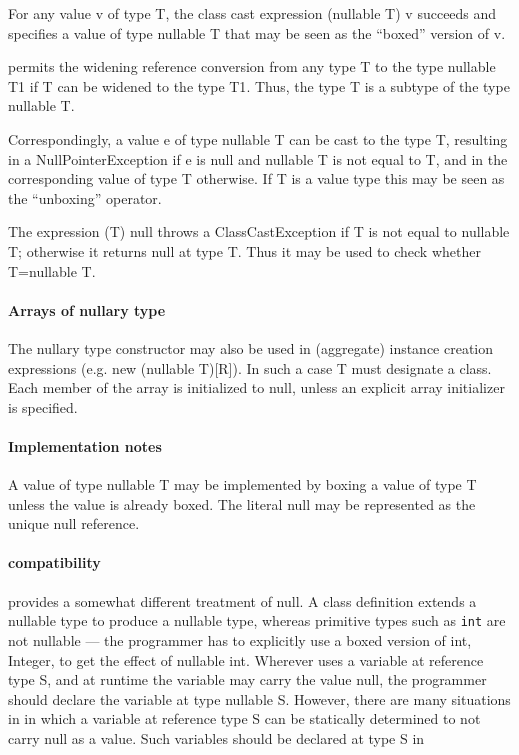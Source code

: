 For any value {\cf v} of type {\cf T}, the class cast expression {\cf
(nullable T) v} succeeds and specifies a value of type {\cf nullable T} that may be
seen as the ``boxed'' version of {\cf v}.

\Xten{} permits the widening reference conversion from any type {\cf T}
to the type {\cf nullable T1} if {\cf T} can be widened to the type {\cf
T1}. Thus, the type {\cf T} is a subtype of the type {\cf nullable T}.

Correspondingly, a value {\cf e} of type {\cf nullable T} can be cast to the
type {\cf T}, resulting in a {\cf NullPointerException} if {\cf e} is
{\cf null} and {\cf nullable T} is not equal to {\cf T}, and in the
corresponding value of type {\cf T} otherwise.  If {\cf T} is a value
type this may be seen as the ``unboxing'' operator.

The expression {\cf (T) null} throws a {\cf ClassCastException} if {\cf
T} is not equal to {\cf nullable T}; otherwise it returns {\cf null} at type
{\cf T}. Thus it may be used to check whether {\cf T=nullable T}.

\paragraph{Arrays of nullary type}
The nullary type constructor may also be used in (aggregate) instance
creation expressions (e.g.{} {\cf new (nullable T)[R]}). In such a
case {\cf T} must designate a class. Each member of the array is
initialized to {\cf null}, unless an explicit array initializer is
specified.

\paragraph{Implementation notes}
A value of type {\cf nullable T} may be implemented by boxing a value of
type {\cf T} unless the value is already boxed. The literal {\cf null}
may be represented as the unique null reference.

\paragraph{\Java{} compatibility}

\java{} provides a somewhat different treatment of {\cf null}.  A
class definition extends a nullable type to produce a nullable type,
whereas primitive types such as {\tt int} are not nullable --- the
programmer has to explicitly use a boxed version of {\cf int}, {\cf
Integer}, to get the effect of {\cf nullable int}. Wherever \Java{} uses a
variable at reference type {\cf S}, and at runtime the variable may
carry the value {\cf null}, the \Xten{} programmer should declare the
variable at type {\cf nullable S}. However, there are many situations
in \java{} in which a variable at reference type {\cf S} can be
statically determined to not carry null as a value. Such variables
should be declared at type {\cf S} in \Xten{}

